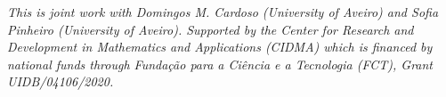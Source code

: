 \documentclass[a4paper]{amsart}
\begin{document}
\bigskip

\emph{This is joint work with Domingos M. Cardoso (University of Aveiro) and Sofia Pinheiro (University of Aveiro).
Supported by the Center for Research and Development in Mathematics and Applications (CIDMA) which is financed by national funds through Funda\c{c}\~{a}o para a Ci\^{e}ncia e a Tecnologia (FCT), Grant UIDB/04106/2020.}
%
%
\end{document}
